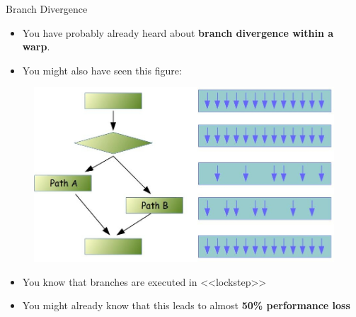 \documentclass[9pt]{beamer}
\newcommand{\emphasize}[1]{\textbf{\color{red} #1 } }
\begin{document}
\begin{frame}[t]{Branch Divergence }
\begin{itemize}
\item You have probably already heard about \textbf{branch divergence within a warp}.
\item You might also have seen this figure: \\
\end{itemize}
\begin{figure}
	\includegraphics[scale=0.22]{images/bd-1.jpg}
	\centering
\end{figure}
\begin{itemize}
\item You know that branches are executed in <<lockstep>>
\item You might already know that this leads to almost \emphasize{50\% performance loss}

\end{itemize}
\end{frame}
\end{document}
